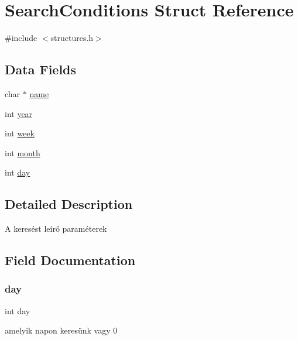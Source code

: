 \hypertarget{struct_search_conditions}{}\section{Search\+Conditions Struct Reference}
\label{struct_search_conditions}


{\ttfamily \#include $<$structures.\+h$>$}

\subsection*{Data Fields}
\begin{DoxyCompactItemize}
\item 
char $\ast$ \hyperlink{struct_search_conditions_a5ac083a645d964373f022d03df4849c8}{name}
\item 
int \hyperlink{struct_search_conditions_abeac221e38b7b9ce7df8722c842bf671}{year}
\item 
int \hyperlink{struct_search_conditions_a3560bdec25d509ef8f4f02409eaa9f1d}{week}
\item 
int \hyperlink{struct_search_conditions_aedb06abe5aff12fa3e7e0e71a374edfb}{month}
\item 
int \hyperlink{struct_search_conditions_a4c11afc03fc3ee49bab660def6558f2a}{day}
\end{DoxyCompactItemize}


\subsection{Detailed Description}
A keresést leírő paraméterek 

\subsection{Field Documentation}
\mbox{\label{struct_search_conditions_a4c11afc03fc3ee49bab660def6558f2a}} 
\subsubsection{\texorpdfstring{day}{day}}
{\footnotesize\ttfamily int day}

amelyik napon keresünk vagy 0 \mbox{\label{struct_search_conditions_aedb06abe5aff12fa3e7e0e71a374edfb}} 
